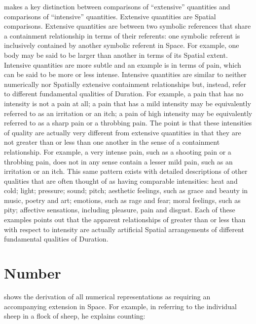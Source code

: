 \cite{bergson:1910} makes a key distinction between comparisons of
``extensive'' quantities and comparisons of ``intensive'' quantities.
Extensive quantities are Spatial comparisons.  Extensive quantities
are between two symbolic references that share a containment
relationship in terms of their referents: one symbolic referent is
inclusively contained by another symbolic referent in Space.  For
example, one body may be said to be larger than another in terms of
its Spatial extent.  Intensive quantities are more subtle and an
example is in terms of pain, which can be said to be more or less
intense.  Intensive quantities are similar to neither numerically nor
Spatially extensive containment relationships but, instead, refer to
different fundamental qualities of Duration.  For example, a pain that
has no intensity is not a pain at all; a pain that has a mild
intensity may be equivalently referred to as an irritation or an itch;
a pain of high intensity may be equivalently referred to as a sharp
pain or a throbbing pain.  The point is that these intensities of
quality are actually very different from extensive quantities in that
they are not greater than or less than one another in the sense of a
containment relationship.  For example, a very intense pain, such as a
shooting pain or a throbbing pain, does not in any sense contain a
lesser mild pain, such as an irritation or an itch.  This same pattern
exists with detailed descriptions of other qualities that are often
thought of as having comparable intensities: heat and cold; light;
pressure; sound; pitch; aesthetic feelings, such as grace and beauty
in music, poetry and art; emotions, such as rage and fear; moral
feelings, such as pity; affective sensations, including pleasure, pain
and disgust.  Each of these examples points out that the apparent
relationships of greater than or less than with respect to intensity
are actually artificial Spatial arrangements of different fundamental
qualities of Duration.

\section{Number}
\label{section:number}

\cite{bergson:1910} shows the derivation of all numerical
representations as requiring an accompanying extension in Space.  For
example, in referring to the individual sheep in a flock of sheep, he
explains counting:

